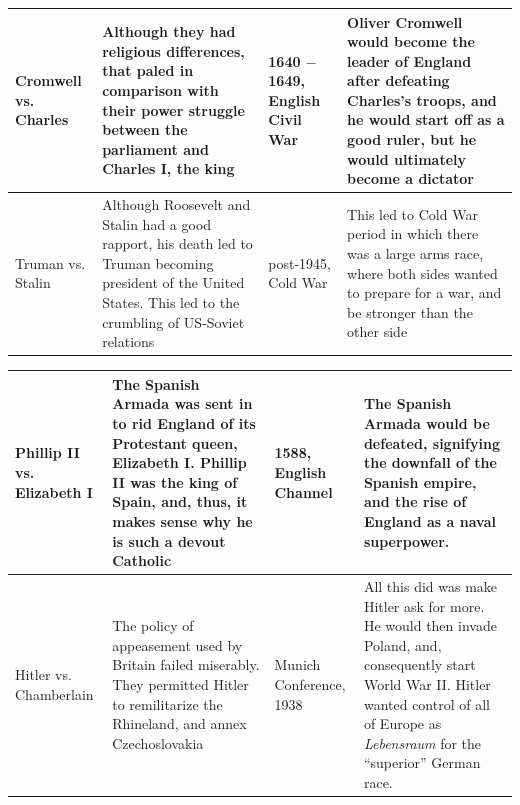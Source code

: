 \documentclass[12pt]{article}
\begin{document}
\begin{enumerate}
\begin{tabular}{|p{}|p{}|p{}|p{}|}
\hline
Cromwell vs. Charles & Although they had religious differences, that paled in comparison with their power struggle between the parliament and Charles I, the king  & 1640 $-$ 1649, English Civil War  & Oliver Cromwell would become the leader of England after defeating Charles's troops, and he would start off as a good ruler, but he would ultimately become a dictator  \\
\hline
Truman vs. Stalin & Although Roosevelt and Stalin had a good rapport, his death led to Truman becoming president of the United States. This led to the crumbling of US-Soviet relations  & post-1945, Cold War  & This led to Cold War period in which there was a large arms race, where both sides wanted to prepare for a war, and be stronger than the other side  \\
\hline
\end{tabular}
\newpage
\hspace{-25pt} \begin{tabular}{|p{}|p{}|p{}|p{}|}
\hline
Phillip II vs. Elizabeth I & The Spanish Armada was sent in to rid England of its Protestant queen, Elizabeth I. Phillip II was the king of Spain, and, thus, it makes sense why he is such a devout Catholic & 1588, English Channel & The Spanish Armada would be defeated, signifying the downfall of the Spanish empire, and the rise of England as a naval superpower.  \\
\hline
Hitler vs. Chamberlain & The policy of appeasement used by Britain failed miserably. They permitted Hitler to remilitarize the Rhineland, and annex Czechoslovakia & Munich Conference, 1938 & All this did was make Hitler ask for more. He would then invade Poland, and, consequently start World War II. Hitler wanted control of all of Europe as \textit{Lebensraum} for the ``superior'' German race.  \\
\hline


\end{tabular}

\hspace{-25pt} \begin{tabular}{|p{}|p{}|p{}|p{}|p{}|p{}|}


\end{tabular}
\end{enumerate}
\end{document}

